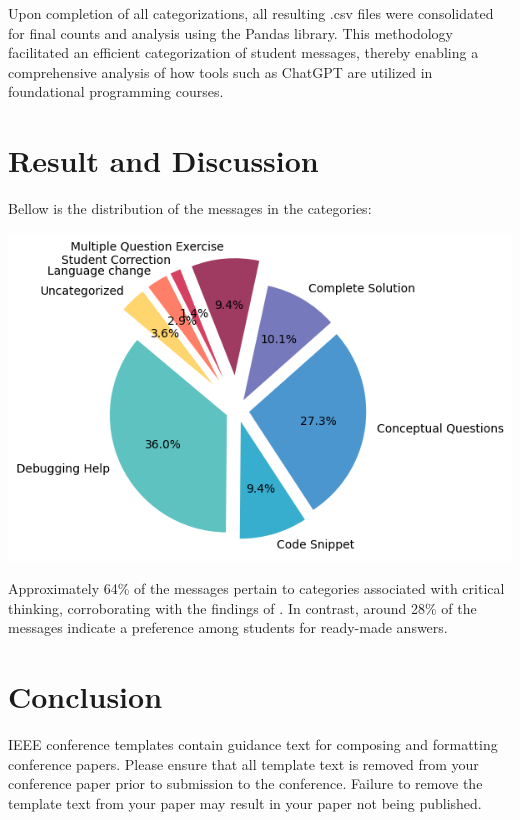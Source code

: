 \documentclass[conference]{IEEEtran}
\begin{document}
Upon completion of all categorizations, all resulting .csv files were consolidated
for final counts and analysis using the Pandas library. This methodology
facilitated an efficient categorization of student messages, thereby enabling
a comprehensive analysis of how tools such as ChatGPT are utilized in foundational
programming courses.

\section{Result and Discussion}

Bellow is the distribution of the messages in the categories:

\centerline{\includegraphics[scale=0.6]{figures/figure1.png}}

Approximately 64\% of the messages pertain to categories associated with
critical thinking, corroborating with the findings of
\cite{10.1007/978-3-031-64299-9_20}. In contrast, around 28\% of the messages
indicate a preference among students for ready-made answers.



\section{Conclusion}




\vspace{12pt}
\color{red}
IEEE conference templates contain guidance text for composing and formatting conference papers. Please ensure that all template text is removed from your conference paper prior to submission to the conference. Failure to remove the template text from your paper may result in your paper not being published.
\end{document}
